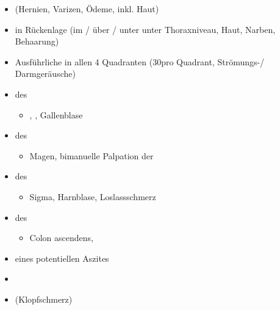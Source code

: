 {
\begin{itemize}
  \item {} (Hernien, Varizen, Ödeme, inkl. Haut)
  \item {} in Rückenlage
  (im / über / unter unter Thoraxniveau, Haut, Narben, Behaarung)
  \item Ausführliche  in allen 4 Quadranten (30\Sec* pro
  Quadrant, Strömungs-/ Darmgeräusche)
  \item {} des
  \begin{itemize}
    \item {}, , Gallenblase
  \end{itemize}
  \item {} des 
  \begin{itemize}
    \item Magen, bimanuelle Palpation der 
  \end{itemize}
  \item {} des 
  \begin{itemize}
    \item Sigma, Harnblase, Loslassschmerz
  \end{itemize}
  \item {} des
  \begin{itemize}
    \item Colon ascendens, 
  \end{itemize}
  \item {} eines potentiellen
    Aszites 
  \item {}
  \item {} (Klopfschmerz)
\end{itemize}

}
